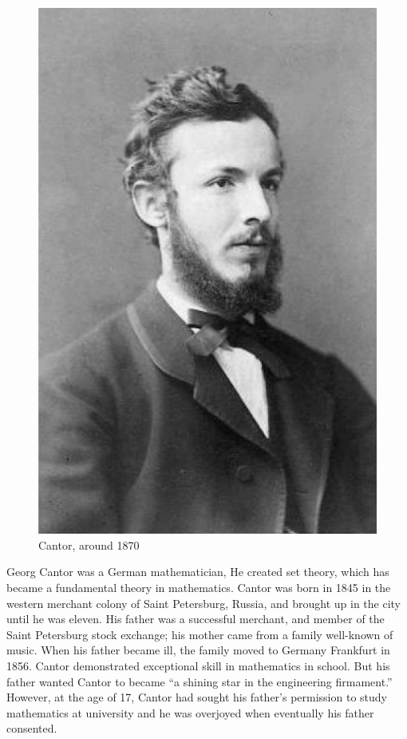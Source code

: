 \documentclass{article}
\begin{document}
\begin{figure}
 \centering
 \includegraphics[scale=0.5]{img/Cantor-1870.png}
 \captionsetup{labelformat=empty}
 \caption{Cantor, around 1870}
 \label{fig:Cantor-1870}
\end{figure}

Georg Cantor was a German mathematician, He created set theory, which has became a fundamental theory in mathematics. Cantor was born in 1845 in the western merchant colony of Saint Petersburg, Russia, and brought up in the city until he was eleven. His father was a successful merchant, and member of the Saint Petersburg stock exchange; his mother came from a family well-known of music. When his father became ill, the family moved to Germany Frankfurt in 1856. Cantor demonstrated exceptional skill in mathematics in school. But his father wanted Cantor to became ``a shining star in the engineering firmament.'' However, at the age of 17, Cantor had sought his father's permission to study mathematics at university and he was overjoyed when eventually his father consented\cite{HanXueTao16}.
\end{document}
